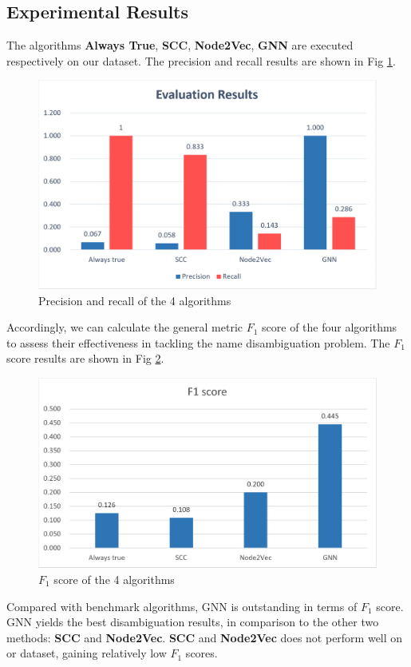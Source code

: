 \documentclass[sigconf, nonacm]{acmart}
\begin{document}
\subsection{Experimental Results}
The algorithms \textbf{Always True}, \textbf{SCC}, \textbf{Node2Vec}, \textbf{GNN} are executed respectively on our dataset. The precision and recall results are shown in Fig \ref{fig:results}.
\begin{figure}[htbp]
    \centering
    \includegraphics[scale = 0.4]{figures/4results.png}
    \caption{Precision and recall of the 4 algorithms}
    \label{fig:results}
\end{figure}
Accordingly, we can calculate the general metric $F_1$ score of the four algorithms to assess their effectiveness in tackling the name disambiguation problem. The $F_1$ score results are shown in Fig \ref{fig:f1}.
\begin{figure}[htbp]
    \centering
    \includegraphics[scale = 0.4]{figures/f1.png}
    \caption{$F_1$ score of the 4 algorithms}
    \label{fig:f1}
\end{figure}
Compared with benchmark algorithms, GNN is outstanding in terms of $F_1$ score. GNN yields the best disambiguation results, in comparison to the other two methods: \textbf{SCC} and \textbf{Node2Vec}. \textbf{SCC} and \textbf{Node2Vec} does not perform well on or dataset, gaining relatively low $F_1$ scores.
\end{document}
